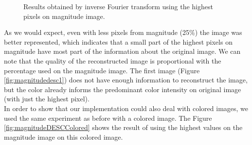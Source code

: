 \documentclass[12pt,a4paper]{article}
\begin{document}
\begin{figure}[!h]
{{		}
		\label{fig:magnitudedesc50}
	}
	\quad
	
	\caption{Results obtained by inverse Fourier transform using the highest pixels on magnitude image.}
	\label{fig:magnitudeDESC}
\end{figure}

As we would expect, even with less pixels from magnitude (25\%) the image was better represented, which indicates that a small part of the highest pixels on magnitude have most part of the information about the original image.  We can note that the quality of the reconstructed image is proportional with the percentage used on the magnitude image. The first image (Figure \ref{fig:magnitudedesc1}) does not have enough information to reconstruct the image, but the color already informs the predominant color intensity on original image (with just the highest pixel). \\
	
In order to show that our implementation could also deal with colored images, we used the same experiment as before with a colored image. The Figure \ref{fig:magnitudeDESCColored} shows the result of using the highest values on the magnitude image on this colored image. \\
\end{document}
